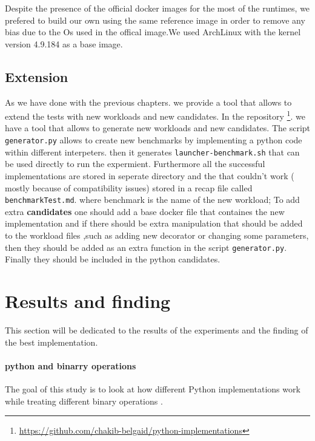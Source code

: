 Despite the presence of the official docker images for the most of the runtimes, we prefered to build our own using the same reference image in order to remove any bias due to the Os used in the offical image.We used ArchLinux with the kernel version 4.9.184 as a base image.


\subsection{Extension}
As we have done with the previous chapters. we provide a tool that allows to extend the tests with new workloads and new candidates.
In the repository \footnote{\url{https://github.com/chakib-belgaid/python-implementations}}.
we have a tool that allows to generate new workloads and new candidates.
The script \texttt{generator.py} allows to create new benchmarks by implementing a python code within different interpeters. then it generates \texttt{launcher-benchmark.sh} that can be used directly to run the expermient. Furthermore all the successful implementations are stored in seperate directory and the that couldn't work ( mostly because of compatibility issues) stored in a recap file called \texttt{benchmarkTest.md}. where benchmark is the name of the new workload;
To add extra \textbf{candidates} one should add a base docker file
that containes the new implementation and if there should be extra manipulation that should be added to the workload files ,such as adding new decorator or changing some parameters, then they should be added as an extra function in the script \texttt{generator.py}. Finally they should be included in the python candidates.

\section{Results and finding}
This section will be dedicated to the results of the experiments and the finding of the best implementation.
\paragraph{python and binarry operations }
The goal of this study is to look at how different Python implementations work while treating different binary operations .


